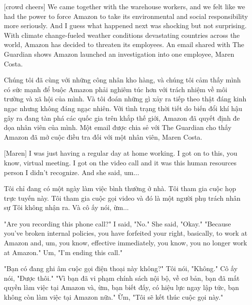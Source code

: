\documentclass[a4paper]{article}
\begin{document}
	[crowd cheers]
	We came together with the warehouse workers, and we felt like we had the power to force Amazon to take its environmental and social responsibility more seriously.
	And I guess what happened next was shocking but not surprising.
	With climate change-fueled weather conditions devastating countries across the world, Amazon has decided to threaten its employees.
    An email shared with The Guardian shows Amazon launched an investigation into one employee, Maren Costa.
	
	\begin{vietnamese-v2}
		Chúng tôi đã cùng với những công nhân kho hàng, và chúng tôi cảm thấy mình có sức mạnh để buộc Amazon phải nghiêm túc hơn với trách nhiệm về môi trường và xã hội của mình.
		Và tôi đoán những gì xảy ra tiếp theo thật đáng kinh ngạc nhưng không đáng ngạc nhiên.
		Với tình trạng thời tiết do biến đổi khí hậu gây ra đang tàn phá các quốc gia trên khắp thế giới, Amazon đã quyết định đe dọa nhân viên của mình.
		Một email được chia sẻ với The Guardian cho thấy Amazon đã mở cuộc điều tra đối với một nhân viên, Maren Costa.
	\end{vietnamese-v2}
	
	[Maren] I was just having a regular day at home working.
	I got on to this, you know, virtual meeting.
	I got on the video call and it was this human resources person
	I didn't recognize.
	And she said, um...
	
	\begin{vietnamese-v2}
		[Maren] Tôi chỉ đang có một ngày làm việc bình thường ở nhà.
		Tôi tham gia cuộc họp trực tuyến này.
		Tôi tham gia cuộc gọi video và đó là một người phụ trách nhân sự
		Tôi không nhận ra.
		Và cô ấy nói, ừm...
	\end{vietnamese-v2}
	
	"Are you recording this phone call?"
	I said, "No." She said, "Okay."
	"Because you've broken internal policies, you have forfeited your right, basically, to work at Amazon and, um, you know, effective immediately, you know, you no longer work at Amazon."
	Um, "I'm ending this call."
	
	\begin{vietnamese-v2}
		"Bạn có đang ghi âm cuộc gọi điện thoại này không?"
		Tôi nói, "Không." Cô ấy nói, "Được thôi."
		"Vì bạn đã vi phạm chính sách nội bộ, về cơ bản, bạn đã mất quyền làm việc tại Amazon và, ừm, bạn biết đấy, có hiệu lực ngay lập tức, bạn không còn làm việc tại Amazon nữa."
		Ừm, "Tôi sẽ kết thúc cuộc gọi này."
	\end{vietnamese-v2}
	
\end{document}
